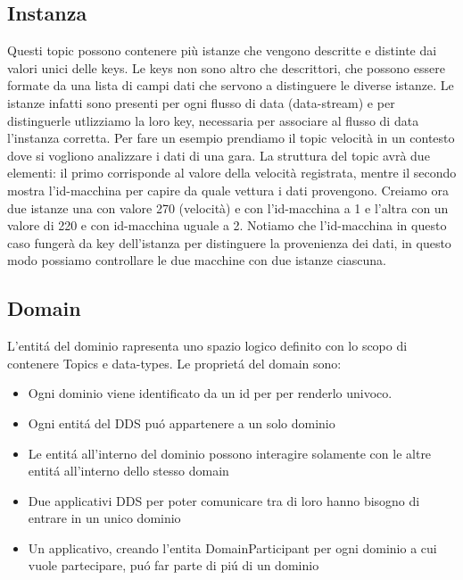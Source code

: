\subsection{Instanza}
Questi topic possono contenere più istanze che vengono
descritte e distinte dai valori unici delle keys.\cite{Instance81:online}
Le keys non sono altro che descrittori, che possono essere
formate da una lista di campi dati che servono a distinguere
le diverse istanze. Le istanze infatti sono presenti per
ogni flusso di data (data-stream) e per distinguerle
utlizziamo la loro key, necessaria per associare al flusso 
di data l'instanza corretta.
Per fare un esempio prendiamo il topic velocità in un contesto dove si
vogliono analizzare i dati di una gara.
La struttura del topic avrà due elementi: il primo corrisponde al valore
della velocità registrata, mentre il secondo mostra l'id-macchina per 
capire da quale vettura i dati provengono.
Creiamo ora due istanze una con valore 270 (velocità) e con 
l'id-macchina a 1 e l'altra con un valore di 220 e con id-macchina 
uguale a 2. Notiamo che l'id-macchina in questo caso fungerà da key 
dell'istanza per distinguere la provenienza dei dati, in questo
modo possiamo controllare le due macchine con due istanze ciascuna.



\subsection{Domain}
L'entitá del dominio rapresenta uno spazio logico definito con
lo scopo di contenere Topics e data-types. 
Le proprietá del domain sono:
\begin{itemize}
    \item Ogni dominio viene identificato da un id per 
    per renderlo univoco.
    \item Ogni entitá del DDS puó appartenere
    a un solo dominio
    \item Le entitá all'interno del dominio possono interagire
    solamente con le altre entitá all'interno dello stesso domain
    \item Due applicativi DDS per poter comunicare tra di loro
    hanno bisogno di entrare in un unico dominio
    \item Un applicativo, creando l'entita DomainParticipant per ogni
    dominio a cui vuole partecipare, puó far parte di piú di un 
    dominio
\end{itemize}\cite{domainrti}


